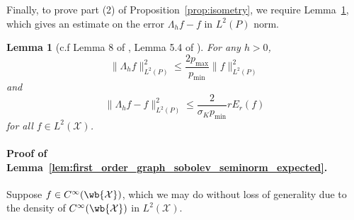 \documentclass[twoside]{article}
\newcommand{\1}{\mathbf{1}}
\newcommand{\Xset}{\mathcal{X}}
\newcommand{\Leb}{L}
\newtheorem{lemma}{Lemma}
\theoremstyle{definition}
\theoremstyle{remark}
\begin{document}
Finally, to prove part (2) of Proposition~\ref{prop:isometry}, we require Lemma~\ref{lem:smoothening_error}, which gives an estimate on the error $\Lambda_h f - f$ in $\Leb^2(P)$ norm.
\begin{lemma}[c.f Lemma 8 of \cite{trillos2019}, Lemma 5.4 of \cite{burago2014}]
	\label{lem:smoothening_error}
	For any $h > 0$, 
	\begin{equation}
	\label{eqn:smoothening_error_norm}
	\bigl\|\Lambda_hf\bigr\|_{\Leb^2(P)}^2 \leq \frac{2p_{\max}}{p_{\min}} \bigl\|f\bigr\|_{\Leb^2(P)}^2
	\end{equation}
	and
	\begin{equation}
	\label{eqn:smoothening_error_energy}
	\bigl\|\Lambda_hf - f\bigr\|_{\Leb^2(P)}^2 \leq \frac{2}{\sigma_Kp_{\min}} r E_r(f)
	\end{equation}
	for all $f \in \Leb^2(\Xset)$.
\end{lemma}

\paragraph{Proof of Lemma~\ref{lem:first_order_graph_sobolev_seminorm_expected}.}
Suppose $f \in C^{\infty}(\wb{\Xset})$, which we may do without loss of generality due to the density of $C^{\infty}(\wb{\Xset})$ in  $\Leb^2(\Xset)$.
\end{document}
